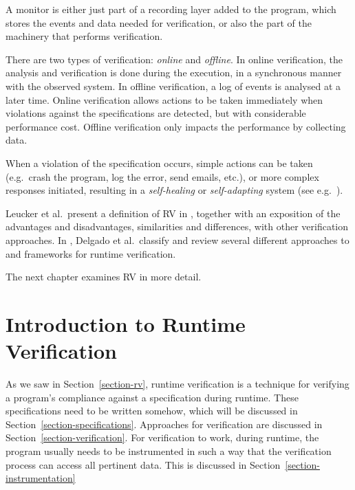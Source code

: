 \documentclass[a4paper,11pt]{kth-mag}
\begin{document}
A monitor is either just part of a recording layer added to the program, which
stores the events and data needed for verification, or also the part of the
machinery that performs verification.

There are two types of verification: \emph{online} and \emph{offline}. In
online verification, the analysis and verification is done during the
execution, in a synchronous manner with the observed system. In offline
verification, a log of events is analysed at a later time. Online verification
allows actions to be taken immediately when violations against the
specifications are detected, but with considerable performance cost. Offline
verification only impacts the performance by collecting data.

When a violation of the specification occurs, simple actions can be taken
(e.g.\ crash the program, log the error, send emails, etc.), or more complex
responses initiated, resulting in a \textit{self-healing} or
\textit{self-adapting} system (see e.g.\ \cite{huebscher08survey}).

Leucker et al.\ present a definition of RV in \cite{leucker09abriefaccount},
together with an exposition of the advantages and disadvantages, similarities
and differences, with other verification approaches. In
\cite{delgado04taxonomy}, Delgado et al.\ classify and review several different
approaches to and frameworks for runtime verification.

The next chapter examines RV in more detail.







\pagestyle{newchap}
\chapter{Introduction to Runtime Verification} \label{chapter-intro-to-rv}

As we saw in Section~\ref{section-rv}, runtime verification is a technique for
verifying a program's compliance against a specification during runtime. These
specifications need to be written somehow, which will be discussed in
Section~\ref{section-specifications}. Approaches for verification are discussed
in Section~\ref{section-verification}. For verification to work, during
runtime, the program usually needs to be instrumented in such a way that the
verification process can access all pertinent data. This is discussed in
Section~\ref{section-instrumentation}
\end{document}
